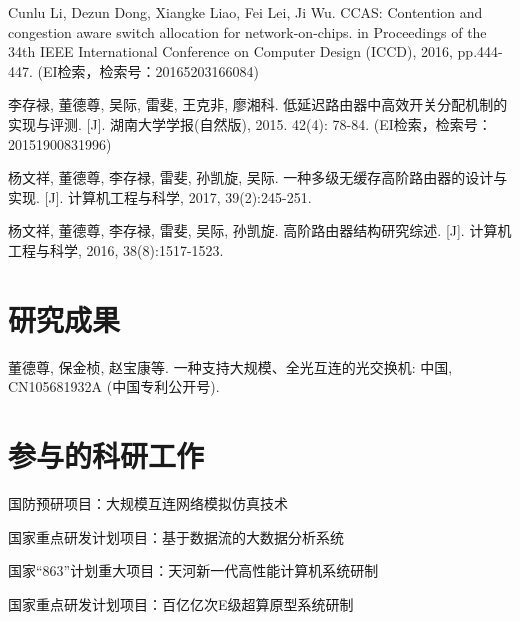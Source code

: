 \begin{resume}
\begin{enumerate}[{[}1{]}]
  \item	Cunlu Li, Dezun Dong, Xiangke Liao, Fei Lei, Ji Wu. CCAS: Contention and congestion aware switch allocation for network-on-chips. in Proceedings of the 34th IEEE International Conference on Computer Design (ICCD), 2016, pp.444-447. (EI检索，检索号：20165203166084)
  \item 李存禄, 董德尊, 吴际, 雷斐, 王克非, 廖湘科. 低延迟路由器中高效开关分配机制的实现与评测. [J]. 湖南大学学报(自然版), 2015. 42(4): 78-84. (EI检索，检索号：20151900831996)
  \item 杨文祥, 董德尊, 李存禄, 雷斐, 孙凯旋, 吴际. 一种多级无缓存高阶路由器的设计与实现. [J]. 计算机工程与科学, 2017, 39(2):245-251.
  \item 杨文祥, 董德尊, 李存禄, 雷斐, 吴际, 孙凯旋. 高阶路由器结构研究综述. [J]. 计算机工程与科学, 2016, 38(8):1517-1523.
  \end{enumerate}

  \section*{研究成果} %
  \begin{enumerate}[{[}1{]}]
  \addtolength{\itemsep}{-.36\baselineskip}%
  \item 董德尊, 保金桢, 赵宝康等. 一种支持大规模、全光互连的光交换机: 中国,
     CN105681932A (中国专利公开号).
  \end{enumerate}


\section*{参与的科研工作}

  \begin{enumerate}[{[}1{]}]
  \addtolength{\itemsep}{-.36\baselineskip}%
  \item 国防预研项目：大规模互连网络模拟仿真技术
  \item 国家重点研发计划项目：基于数据流的大数据分析系统
  \item 国家“863”计划重大项目：天河新一代高性能计算机系统研制
  \item 国家重点研发计划项目：百亿亿次E级超算原型系统研制
  \end{enumerate}
\end{resume}
